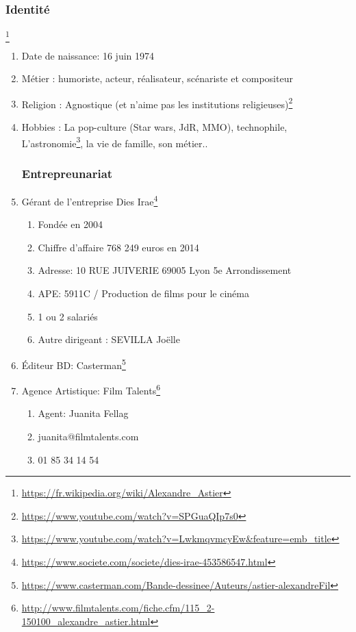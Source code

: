 \subsubsection{Identité}\footnote{\url{https://fr.wikipedia.org/wiki/Alexandre_Astier}}
\begin{enumerate}
\item Date de naissance: 16 juin 1974
\item Métier : humoriste, acteur, réalisateur, scénariste et compositeur
\item Religion : Agnostique (et n’aime pas les institutions religieuses)\footnote{\url{https://www.youtube.com/watch?v=SPGuaQIp7s0}}
\item Hobbies : La pop-culture (Star wars, JdR, MMO), technophile,  L’astronomie\footnote{\url{https://www.youtube.com/watch?v=LwkmqvmcyEw&feature=emb_title}}, la vie de famille, son métier..
\subsubsection{Entrepreunariat}
\item Gérant de l’entreprise Dies Irae\footnote{\url{https://www.societe.com/societe/dies-irae-453586547.html}}
\begin{enumerate}
\item Fondée en 2004
\item Chiffre d’affaire 768 249 euros en 2014
\item Adresse: 10 RUE JUIVERIE 69005 Lyon 5e Arrondissement
\item APE: 5911C / Production de films pour le cinéma
\item 1 ou 2 salariés
\item Autre dirigeant : SEVILLA Joëlle
\end{enumerate}
\item Éditeur BD: Casterman\footnote{\url{https://www.casterman.com/Bande-dessinee/Auteurs/astier-alexandreFil}}
\item Agence Artistique: Film Talents\footnote{\url{http://www.filmtalents.com/fiche.cfm/115_2-150100_alexandre_astier.html}}
\begin{enumerate}
\item Agent: Juanita Fellag
\item juanita@filmtalents.com
\item 01 85 34 14 54
\end{enumerate}


\end{enumerate}
